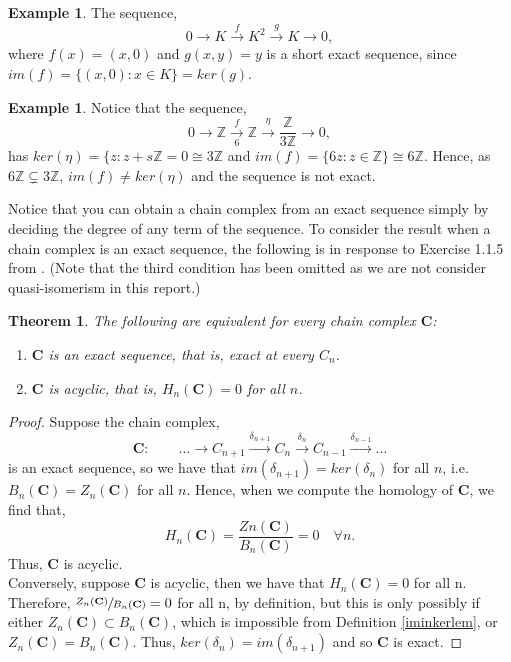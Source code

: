 \documentclass[11.5pt, twoside, a4paper, titlepage]{report}
\providecommand{\bb}[1]{\mathbb{#1}}
\theoremstyle{definition}
\newtheorem{eg}[mydef]{Example}
\theoremstyle{plain}
\newtheorem{thm}[mydef]{Theorem}
\begin{document}
\begin{eg}
The sequence,
\begin{equation*}
0\xrightarrow{} K \xrightarrow{f} K^2 \xrightarrow{g} K \xrightarrow{} 0,
\end{equation*}
where $f(x)=(x,0)$ and $g(x,y)=y$ is a short exact sequence, since $im(f)=\{(x,0): x\in K\}=ker(g)$.
\end{eg}

\begin{eg}
Notice that the sequence, 
\begin{equation*}
0\xrightarrow{}\bb{Z}\xrightarrow[6]{f}\bb{Z}\xrightarrow{\eta}\frac{\bb{Z}}{3\bb{Z}}\xrightarrow{} 0,
\end{equation*}
has $ker(\eta)=\{z:z+s\bb{Z}=0\cong 3\bb{Z}$ and $im(f)=\{6z:z\in \bb{Z}\}\cong 6\bb{Z}$. Hence, as $6\bb{Z}\subsetneq 3\bb{Z}$, $im(f)\neq ker(\eta)$ and the sequence is not exact.
\end{eg}

Notice that you can obtain a chain complex from an exact sequence simply by deciding the degree of any term of the sequence. To consider the result when a chain complex is an exact sequence, the following is in response to Exercise 1.1.5 from \cite{Weibel}. (Note that the third condition has been omitted as we are not consider quasi-isomerism in this report.)

\begin{thm}
The following are equivalent for every chain complex $\mathbf{C}$:
\begin{enumerate}
\item $\mathbf{C}$ is an exact sequence, that is, exact at every $C_n$.
\item $\mathbf{C}$ is acyclic, that is, $H_n(\mathbf{C})=0$ for all $n$.
\end{enumerate}
\end{thm}
\begin{proof}
Suppose the chain complex, 
\begin{equation*}
\mathbf{C}:\qquad \dots \xrightarrow{} C_{n+1} \xrightarrow{\delta_{n+1}} C_n \xrightarrow{\delta_n} C_{n-1} \xrightarrow{\delta_{n-1}} \dots
\end{equation*}
is an exact sequence, so we have that $im(\delta_{n+1})=ker(\delta_n)$ for all $n$, i.e. $B_n(\mathbf{C})=Z_n(\mathbf{C})$ for all $n$. Hence, when we compute the homology of $\mathbf{C}$, we find that,
\begin{equation*}
H_n(\mathbf{C})=\frac{Zn(\mathbf{C})}{B_n(\mathbf{C})}=0 \quad \forall n.
\end{equation*}
Thus, $\mathbf{C}$ is acyclic.\\
Conversely, suppose $\mathbf{C}$ is acyclic, then we have that $H_n(\mathbf{C})=0$ for all n. Therefore, $\sfrac{Z_n(\mathbf{C})}{B_n(\mathbf{C})}=0$ for all n, by definition, but this is only possibly if either $Z_n(\mathbf{C})\subset B_n(\mathbf{C})$, which is impossible from Definition \ref{iminkerlem}, or $Z_n(\mathbf{C})=B_n(\mathbf{C})$. Thus, $ker(\delta_n)=im(\delta_{n+1})$ and so $\mathbf{C}$ is exact.
\end{proof}
\end{document}
